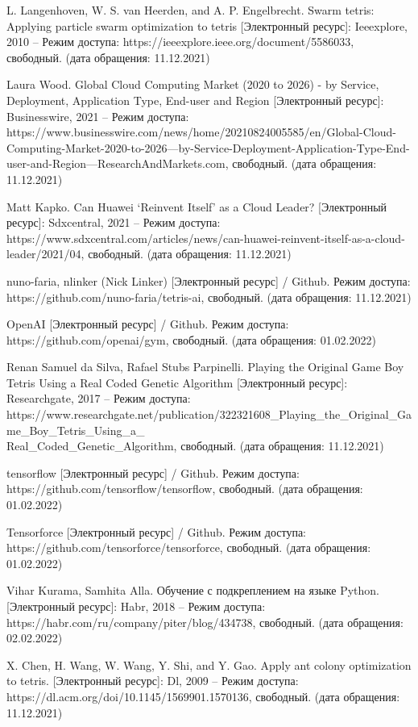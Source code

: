 \documentclass{article}
\begin{document}
\begin{center}
\begin{thebibliography}{}
 L. Langenhoven, W. S. van Heerden, and A. P. Engelbrecht. Swarm tetris: Applying particle swarm optimization to tetris [Электронный ресурс]: Ieeexplore, 2010 – Режим доступа: https://ieeexplore.ieee.org/document/5586033, свободный. (дата обращения: 11.12.2021)

 Laura Wood. Global Cloud Computing Market (2020 to 2026) - by Service, Deployment, Application Type, End-user and Region [Электронный ресурс]: Businesswire, 2021 – Режим доступа: https://www.businesswire.com/news/home/20210824005585/en/Global-Cloud-Computing-Market-2020-to-2026---by-Service-Deployment-Application-Type-End-user-and-Region---ResearchAndMarkets.com, свободный. (дата обращения: 11.12.2021)

 Matt Kapko. Can Huawei ‘Reinvent Itself’ as a Cloud Leader? [Электронный ресурс]: Sdxcentral, 2021 – Режим доступа: https://www.sdxcentral.com/articles/news/can-huawei-reinvent-itself-as-a-cloud-leader/2021/04, свободный. (дата обращения: 11.12.2021)

 nuno-faria, nlinker (Nick Linker) [Электронный ресурс] / Github. Режим доступа: https://github.com/nuno-faria/tetris-ai, свободный. (дата обращения: 11.12.2021)

 OpenAI [Электронный ресурс] / Github. Режим доступа: https://github.com/openai/gym, свободный. (дата обращения: 01.02.2022)

 Renan Samuel da Silva, Rafael Stubs Parpinelli. Playing the Original Game Boy Tetris Using a Real Coded Genetic Algorithm [Электронный ресурс]: Researchgate, 2017 – Режим доступа: https://www.researchgate.net/publication/322321608\_Playing\_the\_Original\_Game\_Boy\_Tetris\_Using\_a\_\\Real\_Coded\_Genetic\_Algorithm, свободный. (дата обращения: 11.12.2021)

 tensorflow [Электронный ресурс] / Github. Режим доступа: https://github.com/tensorflow/tensorflow, свободный. (дата обращения: 01.02.2022)

 Tensorforce [Электронный ресурс] / Github. Режим доступа: https://github.com/tensorforce/tensorforce, свободный. (дата обращения: 01.02.2022)

 Vihar Kurama, Samhita Alla. Обучение с подкреплением на языке Python. [Электронный ресурс]: Habr, 2018 – Режим доступа: https://habr.com/ru/company/piter/blog/434738, свободный. (дата обращения: 02.02.2022)

 X. Chen, H. Wang, W. Wang, Y. Shi, and Y. Gao. Apply ant colony optimization to tetris. [Электронный ресурс]: Dl, 2009 – Режим доступа: https://dl.acm.org/doi/10.1145/1569901.1570136, свободный. (дата обращения: 11.12.2021)

\end{thebibliography}
\end{center}
\end{document}

